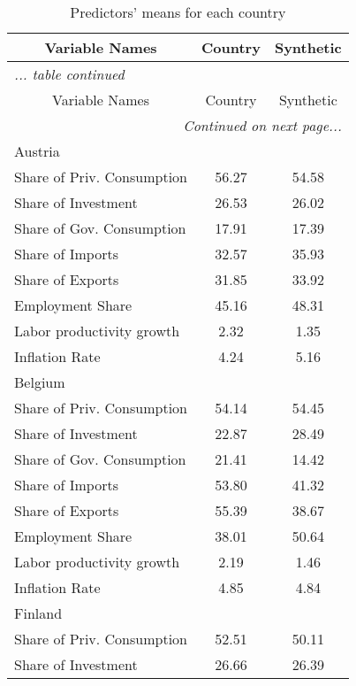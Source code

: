 \begin{center}
\begin{longtable}{lcc}
\caption{\label{clabel} Predictors' means for each country}\\
\hline  
\hline  
 \multicolumn{1}{c}{Variable Names}   & Country  & Synthetic  \\
\hline 
 \endfirsthead
\multicolumn{3}{l}{\emph{... table \thetable{} continued}} \\
\hline \hline 
 \multicolumn{1}{c}{Variable Names}   & Country  & Synthetic  \\
\hline
\endhead
\hline
\multicolumn{3}{r}{\emph{Continued on next page...}}\\
\endfoot
\endlastfoot
Austria &  &  \\  
Share of Priv. Consumption &     56.27 &     54.58 \\  
Share of Investment &     26.53 &     26.02 \\  
Share of Gov. Consumption &     17.91 &     17.39 \\  
Share of Imports &     32.57 &     35.93 \\  
Share of Exports &     31.85 &     33.92 \\  
Employment Share &     45.16 &     48.31 \\  
Labor productivity growth &      2.32 &      1.35 \\  
Inflation Rate &      4.24 &      5.16 \\  
Belgium &  &  \\  
Share of Priv. Consumption &     54.14 &     54.45 \\  
Share of Investment &     22.87 &     28.49 \\  
Share of Gov. Consumption &     21.41 &     14.42 \\  
Share of Imports &     53.80 &     41.32 \\  
Share of Exports &     55.39 &     38.67 \\  
Employment Share &     38.01 &     50.64 \\  
Labor productivity growth &      2.19 &      1.46 \\  
Inflation Rate &      4.85 &      4.84 \\  
Finland &  &  \\  
Share of Priv. Consumption &     52.51 &     50.11 \\  
Share of Investment &     26.66 &     26.39 \\  

\end{longtable}
\end{center}
